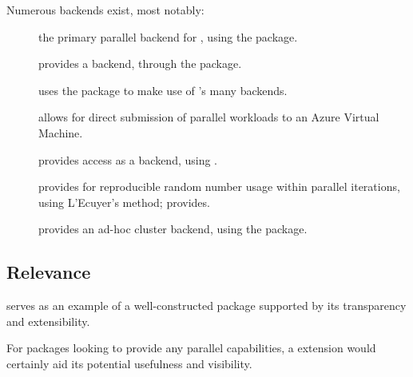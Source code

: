Numerous backends exist, most notably:

\begin{description}
	\item[]
		the primary parallel backend for , using the  package\cite{corporation19}.
	\item[]
		provides a  backend, through the  package\cite{lewis20}.
	\item[]
		uses the  package to make use of 's many backends\cite{bengtsson20do}.
	\item[]
		allows for direct submission of parallel workloads to an Azure Virtual Machine\cite{hoang20}.
	\item[]
		provides  access as a backend, using \cite{weston17}.
	\item[]
		provides for reproducible random number usage within parallel
		iterations, using L'Ecuyer's method; provides\cite{gaujoux20}.
	\item[]
		provides an ad-hoc cluster backend, using the  package\cite{dosnow19}.
\end{description}

\subsection{Relevance}\label{relevance}

 serves as an example of a well-constructed package supported by
its transparency and extensibility.

For packages looking to provide any parallel capabilities, a  extension would certainly aid its potential usefulness and visibility.
